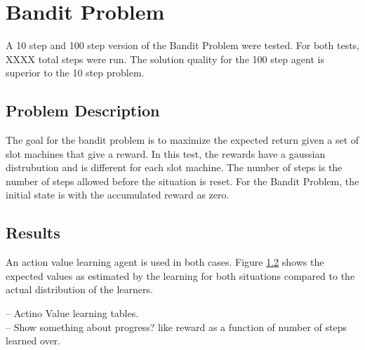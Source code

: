 
\section{Bandit Problem}
A 10 step and 100 step version of the Bandit Problem were tested.  For both tests, XXXX total steps were run.  The solution quality for the 100 step agent is superior to the 10 step problem.

\subsection{Problem Description}
The goal for the bandit problem is to maximize the expected return given a set of slot machines that give a reward.  In this test, the rewards have a gaussian distrubution and is different for each slot machine.  The number of steps is the number of steps allowed before the situation is reset.  For the Bandit Problem, the initial state is with the accumulated reward as zero.

\subsection{Results}
An action value learning agent is used in both cases.  Figure \ref{} shows the expected values as estimated by the learning for both situations compared to the actual distribution of the learners.

-- Actino Value learning tables. \\
-- Show something about progress? like reward as a function of number of steps learned over.



